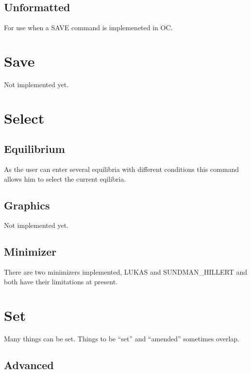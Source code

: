 \documentclass[12pt]{article}
\begin{document}
\subsection{Unformatted}

For use when a SAVE command is implemeneted in OC.

\section{Save }

Not implemented yet.

\section{Select }

\subsection{Equilibrium}

As the user can enter several equilibria with different conditions
this command allows him to select the current eqilibria.

\subsection{Graphics}

Not implemented yet.

\subsection{Minimizer}

There are two minimizers implemented, LUKAS and SUNDMAN\_HILLERT and
both have their limitations at present.

\section{Set }

Many things can be set.  Things to be ``set'' and ``amended''
sometimes overlap.

\subsection{Advanced}
\end{document}
